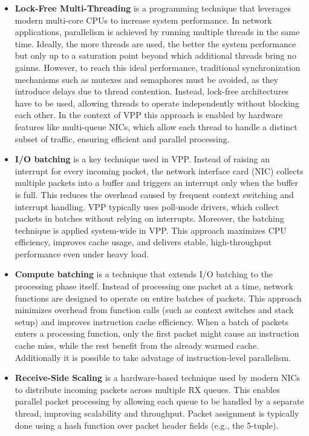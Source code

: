 \begin{itemize}
  \item \textbf{Lock-Free Multi-Threading}
is a programming technique that leverages modern multi-core CPUs to increase system performance. In network applications, parallelism is achieved by running multiple threads in the same time. 
Ideally, the more threads are used, the better the system performance but only up to a saturation point beyond which additional threads bring no gainns. 
However, to reach this ideal performance, traditional synchronization mechanisms such as mutexes and semaphores must be avoided, as they introduce delays due to thread contention. 
Instead, lock-free architectures have to be used, allowing threads to operate independently without blocking each other. 
In the context of VPP this approach is enabled by hardware features like multi-queue NICs, 
which allow each thread to handle a distinct subset of traffic, ensuring efficient and parallel processing.~\cite{LINGUAGLOSSA}

  \item \textbf{I/O batching}
is a key technique used in VPP. 
Instead of raising an interrupt for every incoming packet, the network interface card (NIC) collects multiple packets into a buffer and triggers an interrupt only when the buffer is full. 
This reduces the overhead caused by frequent context switching and interrupt handling. 
VPP typically uses poll-mode drivers, which collect packets in batches without relying on interrupts. 
Moreover, the batching technique is applied system-wide in VPP. 
This approach maximizes CPU efficiency, improves cache usage, and delivers stable, high-throughput performance even under heavy load.~\cite{LINGUAGLOSSA}

  \item \textbf{Compute batching} 
is a technique that extends I/O batching to the processing phase itself. 
Instead of processing one packet at a time, network functions are designed to operate on entire batches of packets. 
This approach minimizes overhead from function calls (such as context switches and stack setup) and improves instruction cache efficiency. 
When a batch of packets enters a processing function, only the first packet might cause an instruction cache miss, while the rest benefit from the already warmed cache.
Additionally it is possible to take advatage of instruction-level parallelism.~\cite{LINGUAGLOSSA}
  
  \item \textbf{Receive-Side Scaling}
is a hardware-based technique used by modern NICs to distribute incoming packets across multiple RX queues. 
This enables parallel packet processing by allowing each queue to be handled by a separate thread, improving scalability and throughput. 
Packet assignment is typically done using a hash function over packet header fields (e.g., the 5-tuple).~\cite{LINGUAGLOSSA}


\end{itemize}
